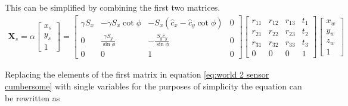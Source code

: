 \documentclass[12pt,oneside,openany,a4paper, %
english, %
masters-t, goldenblock]{usthesis}
\begin{document}
This can be simplified by combining the first two matrices.
\begin{align}
  \bm{X}_s = \alpha
  \begin{bmatrix}
  x_s \\
  y_s \\
  1
  \end{bmatrix} =
  \begin{bmatrix}
  \gamma S_x & -\gamma S_x \cot \phi & -S_x \left( \hat c_x - \hat c_y \cot \phi \right) & 0\\
  0 & \frac{\gamma S_y}{\sin \phi} & -\frac{S_y \hat c_y}{\sin \phi} & 0\\
  0 & 0 & 1 & 0
  \end{bmatrix}
  \begin{bmatrix}
  r_{11} & r_{12} & r_{13} & t_1 \\
  r_{21} & r_{22} & r_{23} & t_2 \\
  r_{31} & r_{32} & r_{33} & t_3 \\
  0 & 0 & 0 & 1
  \end{bmatrix}
  \begin{bmatrix}
  x_w \\
  y_w \\
  z_w \\
  1
  \end{bmatrix}
  \label{eq:world 2 sensor cumbersome}
\end{align}

Replacing the elements of the first matrix in equation \ref{eq:world 2 sensor cumbersome} with single variables for the purposes of simplicity the equation can be rewritten as
\end{document}
